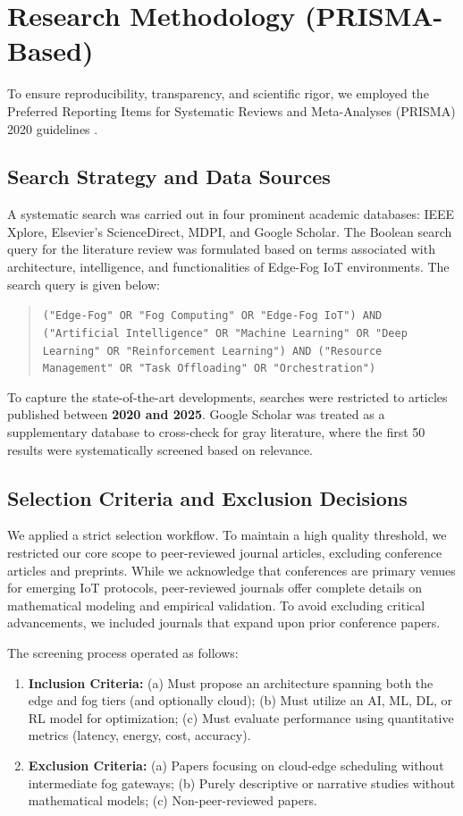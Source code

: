 \documentclass[conference]{IEEEtran}
\begin{document}
\section{Research Methodology (PRISMA-Based)}
\label{sec:methodology}

To ensure reproducibility, transparency, and scientific rigor, we employed the Preferred Reporting Items for Systematic Reviews and Meta-Analyses (PRISMA) 2020 guidelines \cite{b31}.

\subsection{Search Strategy and Data Sources}
A systematic search was carried out in four prominent academic databases: IEEE Xplore, Elsevier’s ScienceDirect, MDPI, and Google Scholar. The Boolean search query for the literature review was formulated based on terms associated with architecture, intelligence, and functionalities of Edge-Fog IoT environments. The search query is given below:

\begin{quotation}
\texttt{("Edge-Fog" OR "Fog Computing" OR "Edge-Fog IoT") AND ("Artificial Intelligence" OR "Machine Learning" OR "Deep Learning" OR "Reinforcement Learning") AND ("Resource Management" OR "Task Offloading" OR "Orchestration")}
\end{quotation}

To capture the state-of-the-art developments, searches were restricted to articles published between \textbf{2020 and 2025}. Google Scholar was treated as a supplementary database to cross-check for gray literature, where the first 50 results were systematically screened based on relevance.

\subsection{Selection Criteria and Exclusion Decisions}
We applied a strict selection workflow. To maintain a high quality threshold, we restricted our core scope to peer-reviewed journal articles, excluding conference articles and preprints. While we acknowledge that conferences are primary venues for emerging IoT protocols, peer-reviewed journals offer complete details on mathematical modeling and empirical validation. To avoid excluding critical advancements, we included journals that expand upon prior conference papers.

The screening process operated as follows:
\begin{enumerate}
    \item \textbf{Inclusion Criteria:} (a) Must propose an architecture spanning both the edge and fog tiers (and optionally cloud); (b) Must utilize an AI, ML, DL, or RL model for optimization; (c) Must evaluate performance using quantitative metrics (latency, energy, cost, accuracy).
    \item \textbf{Exclusion Criteria:} (a) Papers focusing on cloud-edge scheduling without intermediate fog gateways; (b) Purely descriptive or narrative studies without mathematical models; (c) Non-peer-reviewed papers.
\end{enumerate}
\end{document}
